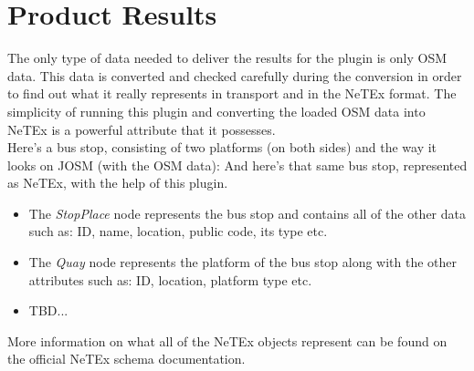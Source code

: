 \section{Product Results}
The only type of data needed to deliver the results for the plugin is only OSM data. This data is converted and checked carefully during the conversion in order to find out what it really represents in transport and in the NeTEx format. The simplicity of running this plugin and converting the loaded OSM data into NeTEx is a powerful attribute that it possesses.\\
Here's a bus stop, consisting of two platforms (on both sides) and the way it looks on JOSM (with the OSM data):
And here's that same bus stop, represented as NeTEx, with the help of this plugin.
\begin{itemize}
\item{The \textit{StopPlace} node represents the bus stop and contains all of the other data such as: ID, name, location, public code, its type etc.}
\item{The \textit{Quay} node represents the platform of the bus stop along with the other attributes such as: ID, location, platform type etc.}
\item{TBD...}
\end{itemize}
More information on what all of the NeTEx objects represent can be found on the official NeTEx schema documentation.
